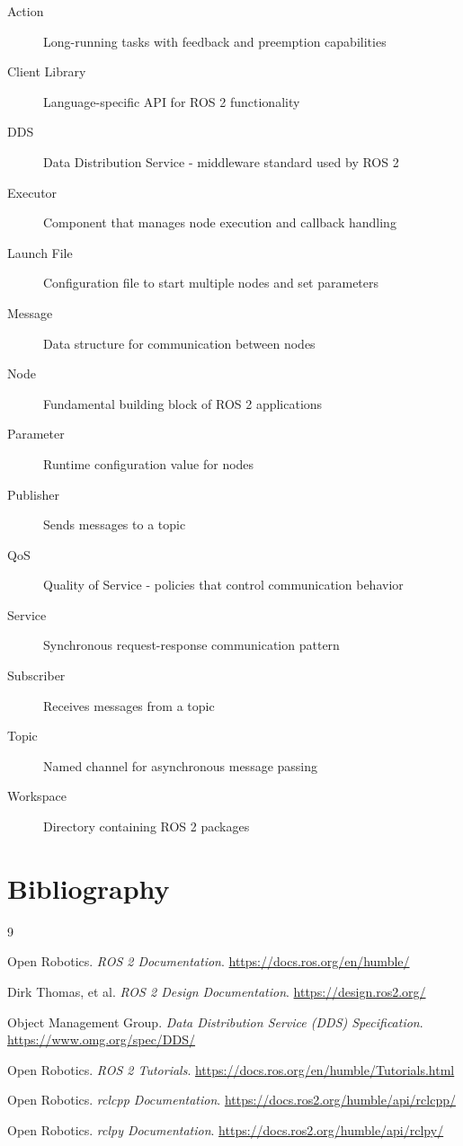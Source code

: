 \documentclass[a4paper,12pt]{book}
\begin{document}
\begin{description}
\item[Action] Long-running tasks with feedback and preemption capabilities
\item[Client Library] Language-specific API for ROS 2 functionality
\item[DDS] Data Distribution Service - middleware standard used by ROS 2
\item[Executor] Component that manages node execution and callback handling
\item[Launch File] Configuration file to start multiple nodes and set parameters
\item[Message] Data structure for communication between nodes
\item[Node] Fundamental building block of ROS 2 applications
\item[Parameter] Runtime configuration value for nodes
\item[Publisher] Sends messages to a topic
\item[QoS] Quality of Service - policies that control communication behavior
\item[Service] Synchronous request-response communication pattern
\item[Subscriber] Receives messages from a topic
\item[Topic] Named channel for asynchronous message passing
\item[Workspace] Directory containing ROS 2 packages
\end{description}

\chapter{Bibliography}

\begin{thebibliography}{9}

Open Robotics. \textit{ROS 2 Documentation}. 
\url{https://docs.ros.org/en/humble/}

Dirk Thomas, et al. \textit{ROS 2 Design Documentation}. 
\url{https://design.ros2.org/}

Object Management Group. \textit{Data Distribution Service (DDS) Specification}. 
\url{https://www.omg.org/spec/DDS/}

Open Robotics. \textit{ROS 2 Tutorials}. 
\url{https://docs.ros.org/en/humble/Tutorials.html}

Open Robotics. \textit{rclcpp Documentation}. 
\url{https://docs.ros2.org/humble/api/rclcpp/}

Open Robotics. \textit{rclpy Documentation}. 
\url{https://docs.ros2.org/humble/api/rclpy/}

\end{thebibliography}

\end{document}
